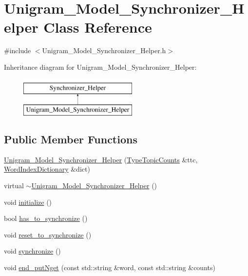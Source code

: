 \hypertarget{class_unigram___model___synchronizer___helper}{
\section{Unigram\_\-Model\_\-Synchronizer\_\-Helper Class Reference}
\label{class_unigram___model___synchronizer___helper}
}


{\ttfamily \#include $<$Unigram\_\-Model\_\-Synchronizer\_\-Helper.h$>$}

Inheritance diagram for Unigram\_\-Model\_\-Synchronizer\_\-Helper:\begin{figure}[H]
\begin{center}
\leavevmode
\includegraphics[height=2cm]{class_unigram___model___synchronizer___helper}
\end{center}
\end{figure}
\subsection*{Public Member Functions}
\begin{DoxyCompactItemize}
\item 
\hyperlink{class_unigram___model___synchronizer___helper_a19885d499775be2eeb436c50a9b8aabc}{Unigram\_\-Model\_\-Synchronizer\_\-Helper} (\hyperlink{class_type_topic_counts}{TypeTopicCounts} \&ttc, \hyperlink{class_word_index_dictionary}{WordIndexDictionary} \&dict)
\item 
virtual \hyperlink{class_unigram___model___synchronizer___helper_a7f69b2fb3efc93bd61a7c0446d257d86}{$\sim$Unigram\_\-Model\_\-Synchronizer\_\-Helper} ()
\item 
void \hyperlink{class_unigram___model___synchronizer___helper_aa1f5e5b097ff5f089dde9b34dd2fae3e}{initialize} ()
\item 
bool \hyperlink{class_unigram___model___synchronizer___helper_ac07d07668ba79d9748d2f52629ccf50e}{has\_\-to\_\-synchronize} ()
\item 
void \hyperlink{class_unigram___model___synchronizer___helper_a3e9fef7c7c827ced4ec473e99c2c2ba0}{reset\_\-to\_\-synchronize} ()
\item 
void \hyperlink{class_unigram___model___synchronizer___helper_a270835ef882ab219a7f9ffe6000627e7}{synchronize} ()
\item 
void \hyperlink{class_unigram___model___synchronizer___helper_a07f7982f9ad12c616fef9d3abefe23e1}{end\_\-putNget} (const std::string \&word, const std::string \&counts)
\end{DoxyCompactItemize}


